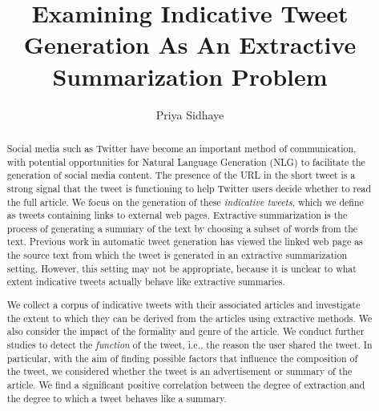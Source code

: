 \documentclass[doublespaced, 12pt]{ut-thesis}
\author{Priya Sidhaye}
\title{Examining Indicative Tweet Generation As An Extractive Summarization Problem}
\begin{document}
\begin{preliminary}

\maketitle


\begin{abstract}

Social media such as Twitter have become an important method of communication, with potential opportunities for Natural Language Generation (NLG) to facilitate the generation of social media content. The presence of the URL in the short tweet is a strong signal that the tweet is functioning to help Twitter users decide whether to read the full article. We focus on the generation of these \emph{indicative tweets}, which we define as tweets containing links to external web pages. Extractive summarization is the process of generating a summary of the text by choosing a subset of words from the text. Previous work in automatic tweet generation has viewed the linked web page as the source text from which the tweet is generated in an extractive summarization setting. However, this setting may not be appropriate, because it is unclear to what extent indicative tweets actually behave like extractive summaries.

We collect a corpus of indicative tweets with their associated articles and investigate the extent to which they can be derived from the articles using extractive methods. We also consider the impact of the formality and genre of the article. We conduct further studies to detect the \textit{function} of the tweet, i.e., the reason the user shared the tweet. In particular, with the aim of finding possible factors that influence the composition of the tweet, we considered whether the tweet is an advertisement or summary of the article. We find a significant positive correlation between the degree of extraction and the degree to which a tweet behaves like a summary. 


\end{abstract}
\end{preliminary}
\end{document}
